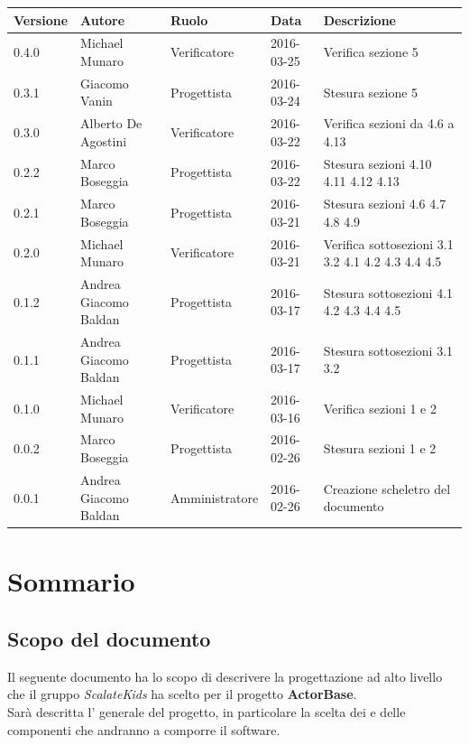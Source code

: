 \documentclass{scalatekids-article}
\begin{document}
\begin{center}
  \begin{tabular}{| l | l | l | l | p{5cm} |}
    \hline
    Versione & Autore & Ruolo & Data & Descrizione \\
    \hline
    0.4.0 & Michael Munaro & Verificatore & 2016-03-25 & Verifica sezione 5\\
    \hline
    0.3.1 & Giacomo Vanin & Progettista & 2016-03-24 & Stesura sezione 5\\
    \hline
    0.3.0 & Alberto De Agostini & Verificatore & 2016-03-22 & Verifica sezioni da 4.6 a 4.13\\
    \hline
    0.2.2 & Marco Boseggia & Progettista & 2016-03-22 & Stesura sezioni 4.10 4.11 4.12 4.13\\
    \hline
    0.2.1 & Marco Boseggia & Progettista & 2016-03-21 & Stesura sezioni 4.6 4.7 4.8 4.9\\
    \hline
    0.2.0 & Michael Munaro & Verificatore & 2016-03-21 & Verifica sottosezioni 3.1 3.2 4.1 4.2 4.3 4.4 4.5\\
    \hline
    0.1.2 & Andrea Giacomo Baldan & Progettista & 2016-03-17 & Stesura sottosezioni 4.1 4.2 4.3 4.4 4.5\\
    \hline
    0.1.1 & Andrea Giacomo Baldan & Progettista & 2016-03-17 & Stesura sottosezioni 3.1 3.2\\
    \hline
    0.1.0 & Michael Munaro & Verificatore & 2016-03-16 & Verifica sezioni 1 e 2\\
    \hline
    0.0.2 & Marco Boseggia & Progettista & 2016-02-26 & Stesura sezioni 1 e 2\\
    \hline
    0.0.1 & Andrea Giacomo Baldan & Amministratore & 2016-02-26 & Creazione scheletro del documento\\
    \hline
  \end{tabular}
\end{center}
\tableofcontents
\newpage
{}
\section{Sommario}
\subsection{Scopo del documento}
Il seguente documento ha lo scopo di descrivere la progettazione ad alto livello che il gruppo \textit{ScalateKids} ha scelto per il progetto \textbf{ActorBase}.\\
Sarà descritta l' generale del progetto, in particolare la scelta dei  e delle componenti che andranno a comporre il software.
\prodPurpose
\glossExpl
\end{document}
